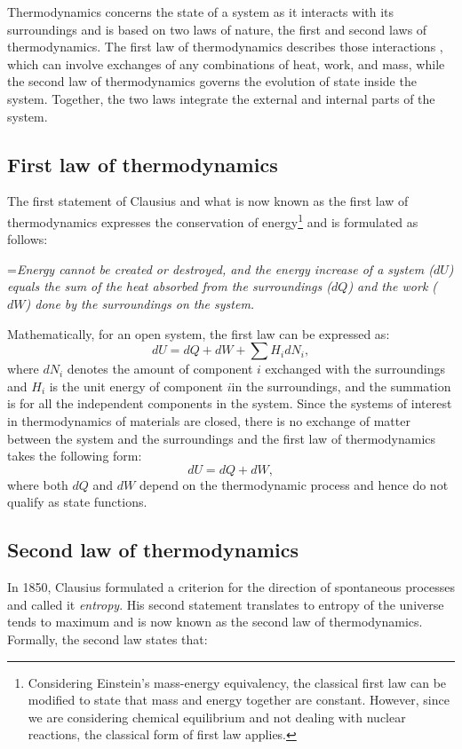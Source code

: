 	Thermodynamics concerns the state of a system as it interacts with its surroundings and is based on two laws of nature, the first and second laws of thermodynamics. The first law of thermodynamics describes those interactions , which can involve exchanges of any combinations of heat, work, and mass, while the second law of thermodynamics governs the evolution of state inside the system. Together, the two laws   integrate the external and internal parts of the system.

	\subsection{First law of thermodynamics}
	The first statement of Clausius and what is now known as the first law of thermodynamics expresses the conservation of energy\footnote{Considering Einstein's mass-energy equivalency, the classical first law can be modified to state that mass and energy together are constant. However, since we are considering chemical equilibrium and not dealing with nuclear reactions, the classical form of first law applies.} and is formulated as follows:

		\hangindent=\parindent \emph{Energy cannot be created or destroyed, and the energy increase of a system ($dU$) equals the sum of the heat absorbed from the surroundings ($dQ$) and the work ($dW$) done by the surroundings on the system.}

	\noindent Mathematically, for an open system, the first law can be expressed as:
	\begin{equation}\label{eqn:flot}
		dU = dQ + dW + \sum H_i dN_i,
	\end{equation}
	where $dN_i$ denotes the amount of component $i$ exchanged with the surroundings and $H_i$ is the unit energy of component $i$in the surroundings, and the summation is for all the independent components in the system. Since the systems of interest in thermodynamics of materials are closed, there is no exchange of matter between the system and the surroundings and the first law of thermodynamics takes the following form:
	\begin{equation}\label{eqn:flot1}
		dU = dQ + dW,
	\end{equation}
	where both $dQ$ and $dW$ depend on the thermodynamic process and hence do not qualify as state functions.

	\subsection{Second law of thermodynamics}
	In 1850, Clausius formulated a criterion for the direction of spontaneous processes and called it \emph{entropy}. His second statement translates to entropy of the universe tends to maximum and is now known as the second law of thermodynamics. Formally, the second law states that:

